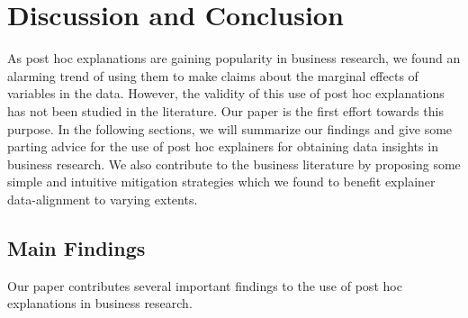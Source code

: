 \documentclass[mnsc,blindrev]{informs3}
\begin{document}
\section{Discussion and Conclusion}
    \label{sec:discussion}
    As post hoc explanations are gaining popularity in business research, we found an alarming trend of using them to make claims about the marginal effects of variables in the data.  However, the validity of this use of post hoc explanations has not been studied in the literature. 
    Our paper is the first effort towards this purpose. 
     In the following sections, we will summarize our findings and give some parting advice for the use of post hoc explainers for obtaining data insights in business research. 
    We also contribute to the business literature by proposing some simple and intuitive mitigation strategies which we found to benefit explainer data-alignment to varying extents.


    \subsection{Main Findings}
        Our paper contributes several important findings to the use of post hoc explanations in business research.
\end{document}
